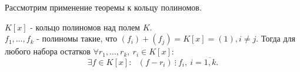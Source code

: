 Рассмотрим применение теоремы к кольцу полиномов.

\begin{thm}
$K[x]$ - кольцо полиномов над полем $K$.\\
$f_1, \dots, f_k$ - полиномы такие, что $(f_i) + (f_j) = K[x] = (1), i \neq j$.
Тогда для любого набора остатков $\forall r_1, \dots, r_k, ~r_i \in K[x]$:
\[\exists f \in K[x]:~~~(f - r_i)~\vdots~f_i, ~i = \overline{1, k}.\]
\end{thm}

